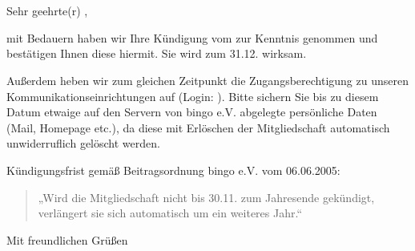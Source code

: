 \documentclass[letterhead]{bingoevletter}
\begin{document}
	\begin{letter}{\exMitgliedAnrede{} \exMitgliedVorname{} \exMitgliedName\\
			\exMitgliedStrasse\\
			\exMitgliedStadt
		}
	\opening{Sehr geehrte(r) \exMitgliedAnrede{} \exMitgliedName,}

	mit Bedauern haben wir Ihre Kündigung vom \def\kuendigungsdatum{} zur Kenntnis genommen und bestätigen Ihnen diese hiermit. Sie wird zum 31.12.\kuendigungsjahr{} wirksam.

	Außerdem heben wir zum gleichen Zeitpunkt die Zugangsberechtigung zu unseren Kommunikationseinrichtungen auf (Login: \texttt{\exMitgliedLogin}).
	Bitte sichern Sie bis zu diesem Datum etwaige auf den Servern von bingo e.V. abgelegte persönliche Daten (Mail, Homepage etc.), da diese mit Erlöschen der Mitgliedschaft automatisch unwiderruflich gelöscht werden.


	Kündigungsfrist gemäß Beitragsordnung bingo e.V. vom 06.06.2005:%
	\begin{quotation}
	„Wird die Mitgliedschaft nicht bis 30.11. zum Jahresende gekündigt,
	verlängert sie sich automatisch um ein weiteres Jahr.“
	\end{quotation}


	\closing{Mit freundlichen Grüßen}
	\end{letter}
\end{document}
